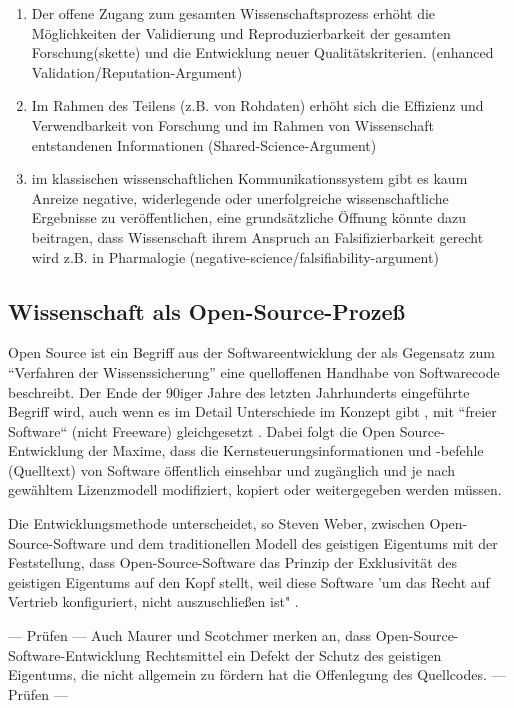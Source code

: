 \begin{enumerate}
\item Der offene Zugang zum gesamten Wissenschaftsprozess erhöht die Möglichkeiten der Validierung und Reproduzierbarkeit der gesamten Forschung(skette) und die Entwicklung neuer Qualitätskriterien. (enhanced Validation/Reputation-Argument)
\item Im Rahmen des Teilens (z.B. von Rohdaten) erhöht sich die Effizienz und Verwendbarkeit von Forschung und im Rahmen von Wissenschaft entstandenen Informationen (Shared-Science-Argument)
\item im klassischen wissenschaftlichen Kommunikationssystem gibt es kaum Anreize negative, widerlegende oder unerfolgreiche wissenschaftliche Ergebnisse zu veröffentlichen, eine grundsätzliche Öffnung könnte dazu beitragen, dass Wissenschaft ihrem Anspruch an Falsifizierbarkeit gerecht wird z.B. in Pharmalogie (negative-science/falsifiability-argument)
\end{enumerate}

\subsection{Wissenschaft als Open-Source-Prozeß}

Open Source ist ein Begriff aus der Softwareentwicklung der als Gegensatz zum “Verfahren der Wissenssicherung” \cite{stallman2002} eine quelloffenen Handhabe von Softwarecode beschreibt. Der Ende der 90iger Jahre des letzten Jahrhunderts eingeführte Begriff wird, auch wenn es im Detail Unterschiede im Konzept gibt \cite{suchen}, mit “freier Software“ (nicht Freeware) gleichgesetzt \cite{suchen}. Dabei folgt die Open Source-Entwicklung der Maxime, dass die Kernsteuerungsinformationen und -befehle (Quelltext) von Software öffentlich einsehbar und zugänglich und je nach gewähltem Lizenzmodell modifiziert, kopiert oder weitergegeben werden müssen\cite{suchen}. 

Die Entwicklungsmethode unterscheidet, so Steven Weber, zwischen Open-Source-Software und dem traditionellen Modell des geistigen Eigentums mit der Feststellung, dass Open-Source-Software das Prinzip der Exklusivität des geistigen Eigentums auf den Kopf stellt, weil diese Software 'um das Recht auf Vertrieb konfiguriert, nicht auszuschließen ist" \cite{suchen}. 

--- Prüfen ---
Auch Maurer und Scotchmer merken an, dass Open-Source-Software-Entwicklung Rechtsmittel ein Defekt der Schutz des geistigen Eigentums, die nicht allgemein zu fördern hat die Offenlegung des Quellcodes. 
--- Prüfen ---

